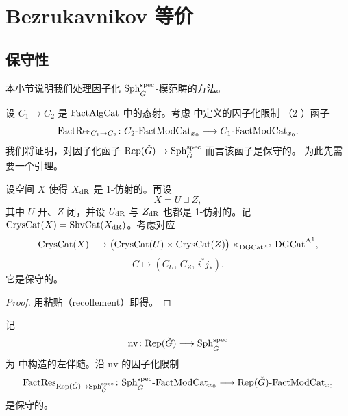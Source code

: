 
\section{Bezrukavnikov 等价}
\label{sec:b}

\subsection{保守性}
\label{sec:conservativity}

本小节说明我们处理因子化 $\mathrm{Sph}^{\mathrm{spec}}_{\check G}$-模范畴的方法。

设 $C_1\to C_2$ 是 $\mathrm{FactAlgCat}$ 中的态射。考虑 \cite{CF} 中定义的因子化限制
（2-）函子
\[
\mathrm{FactRes}_{C_1\to C_2}\colon
C_2\text{-}\mathrm{FactModCat}_{x_0}\longrightarrow C_1\text{-}\mathrm{FactModCat}_{x_0}.
\]
我们将证明，对因子化函子 $\mathrm{Rep}(\check G)\to \mathrm{Sph}^{\mathrm{spec}}_{\check G}$ 而言该函子是保守的。
为此先需要一个引理。

\begin{lemma}\label{lem:3.3.1.1}
设空间 $X$ 使得 $X_{\mathrm{dR}}$ 是 1-仿射的。再设
\[
X=U\sqcup Z,
\]
其中 $U$ 开、$Z$ 闭，并设 $U_{\mathrm{dR}}$ 与 $Z_{\mathrm{dR}}$ 也都是 1-仿射的。记
$\mathrm{CrysCat}(X)=\mathrm{ShvCat}(X_{\mathrm{dR}})$。考虑对应
\begin{equation}
\mathrm{CrysCat}(X)\longrightarrow
\bigl(\mathrm{CrysCat}(U)\times \mathrm{CrysCat}(Z)\bigr)
\times_{\mathrm{DGCat}^{\times 2}}\mathrm{DGCat}^{\Delta^1},
\label{eq:3.3.1}
\end{equation}
\begin{equation}
C\longmapsto (C_U,\,C_Z,\,i^{*}j_{*}).
\label{eq:3.3.2}
\end{equation}
它是保守的。
\end{lemma}

\begin{proof}
用粘贴（recollement）即得。
\end{proof}

\begin{proposition}\label{prop:3.3.1.2}
记
\[
\mathrm{nv}\colon \mathrm{Rep}(\check G)\longrightarrow \mathrm{Sph}^{\mathrm{spec}}_{\check G}
\]
为 \cite[附录 B.2.13]{ABC+24a} 中构造的左伴随。沿 $\mathrm{nv}$ 的因子化限制
\[
\mathrm{FactRes}_{\mathrm{Rep}(\check G)\to \mathrm{Sph}^{\mathrm{spec}}_{\check G}}\colon
\mathrm{Sph}^{\mathrm{spec}}_{\check G}\text{-}\mathrm{FactModCat}_{x_0}\longrightarrow
\mathrm{Rep}(\check G)\text{-}\mathrm{FactModCat}_{x_0}
\]
是保守的。
\end{proposition}


